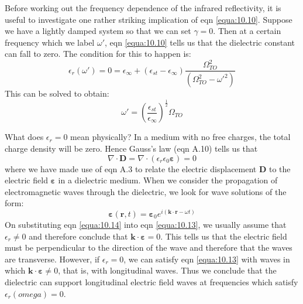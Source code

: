 \documentclass[12pt]{book}
\begin{document}
Before working out the frequency dependence of the infrared reflectivity, it is useful to investigate one rather striking implication of eqn \ref{equa:10.10}. Suppose we have a lightly damped system so that we can set $\gamma=0$. Then at a certain frequency which we label $\omega'$, eqn \ref{equa:10.10} tells us that the dielectric constant can fall to zero. The condition for this to happen is:
\begin{equation}\label{equa:10.11}
  \epsilon_r(\omega')=0=\epsilon_{\infty}+(\epsilon_{st}-\epsilon_{\infty})\frac{\Omega_{TO}^2}{(\Omega_{TO}^2-\omega'^2)}
\end{equation}
This can be solved to obtain:
\begin{equation}\label{equa:10.12}
  \omega'=(\frac{\epsilon_{st}}{\epsilon_{\infty}})^{\frac{1}{2}}\Omega_{TO}
\end{equation}

What does $\epsilon_r=0$ mean physically? In a medium with no free charges, the total charge density will be zero. Hence Gauss's law (eqn A.10) tells us that
\begin{equation}\label{equa:10.13}
  \nabla\cdot\mathbf{D}=\nabla\cdot(\epsilon_r\epsilon_0\boldsymbol{\varepsilon})=0
\end{equation}
where we have made use of eqn A.3 to relate the electric displacement $\mathbf{D}$ to the electric field $\boldsymbol{\varepsilon}$ in a dielectric medium. When we consider the propagation of electromagnetic waves through the dielectric, we look for wave solutions of the form:
\begin{equation}\label{equa:10.14}
  \boldsymbol{\varepsilon}(\mathbf{r},t)=\boldsymbol{\varepsilon}_0e^{i(\mathbf{k}\cdot\mathbf{r}-\omega t)}
\end{equation}
On substituting eqn \ref{equa:10.14} into eqn \ref{equa:10.13}, we usually assume that $\epsilon_r\neq0$ and therefore conclude that $\mathbf{k}\cdot\boldsymbol{\varepsilon}=0$. This tells us that the electric field must be perpendicular to the direction of the wave and therefore that the waves are transverse. However, if $\epsilon_r=0$, we can satisfy eqn \ref{equa:10.13} with waves in which $\mathbf{k}\cdot\boldsymbol{\varepsilon}\neq0$, that is, with longitudinal waves. Thus we conclude that the dielectric can support longitudinal electric field waves at frequencies which satisfy $\epsilon_r(omega)=0$.
\end{document}
